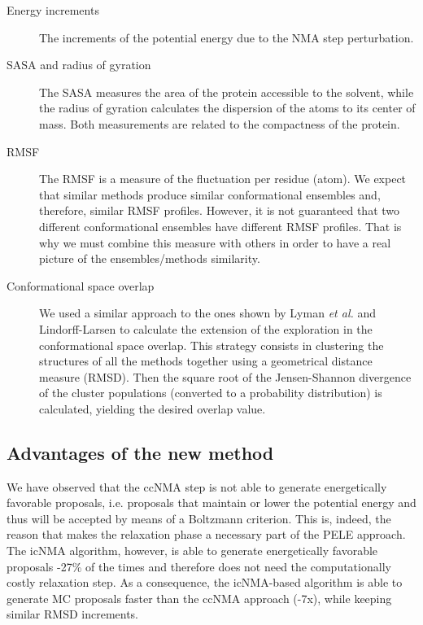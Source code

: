 \begin{description}

\item [Energy increments]
The increments of the potential energy due to the NMA step perturbation.  

\item [SASA and radius of gyration]
The SASA measures the area of the protein accessible to the solvent, while the radius of gyration calculates the dispersion of the atoms to its center of mass. Both measurements are related to the compactness of the protein.

\item [RMSF]
The RMSF is a measure of the fluctuation per residue (\calpha atom). We expect that similar methods produce similar conformational ensembles and, therefore, similar RMSF profiles. However, it is not guaranteed that two different conformational ensembles have different RMSF profiles. That is why we must combine this measure with others in order to have a real picture of the ensembles/methods similarity.      

\item [Conformational space overlap]
We used a similar approach to the ones shown by Lyman \textit{et al.} \cite{lyman_ensemble-based_2006} and Lindorff-Larsen \cite{lindorff-larsen_similarity_2009} to calculate the extension of the exploration in the conformational space overlap. This strategy consists in clustering the structures of all the methods together using a geometrical distance measure (RMSD). Then the square root of the Jensen-Shannon divergence of the cluster populations (converted to a probability distribution) is calculated, yielding the desired overlap value.
\end{description}

\subsection{Advantages of the new method}
We have observed that the ccNMA step is not able to generate energetically favorable proposals, i.e. proposals that maintain or lower the potential energy and thus will be accepted by means of a Boltzmann criterion. This is, indeed, the reason that makes the relaxation phase a necessary part of the PELE approach. The icNMA algorithm, however, is able to generate energetically favorable proposals -27\% of the times and therefore does not need the computationally costly relaxation step. As a consequence, the icNMA-based algorithm is able to generate MC proposals faster than the ccNMA approach (-7x), while keeping similar RMSD increments.   

